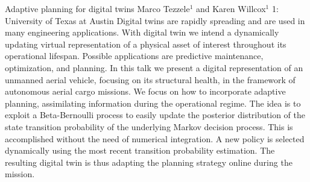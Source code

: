 \begin{addmargin}[2em]{0em}
\vspace{1.5ex}
\abs
{Adaptive planning for digital twins}
{Marco Tezzele$^{1}$ and Karen Willcox$^{1}$}
{1: University of Texas at Austin}
{Digital twins are rapidly spreading and are used in many engineering applications. With digital twin we intend a dynamically updating virtual representation of a physical asset of interest throughout its operational lifespan. Possible applications are predictive maintenance, optimization, and planning. In this talk we present a digital representation of an unmanned aerial vehicle, focusing on its structural health, in the framework of autonomous aerial cargo missions. We focus on how to incorporate adaptive planning, assimilating information during the operational regime. The idea is to exploit a Beta-Bernoulli process to easily update the posterior distribution of the state transition probability of the underlying Markov decision process. This is accomplished without the need of numerical integration. A new policy is selected dynamically using the most recent transition probability estimation. The resulting digital twin is thus adapting the planning strategy online during the mission.}
\end{addmargin}


